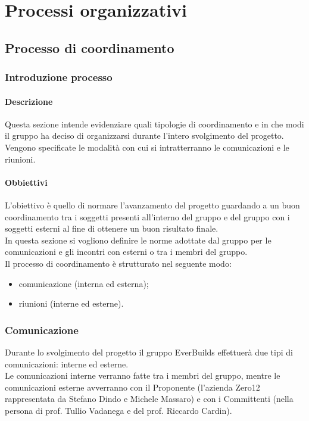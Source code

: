 \section{Processi organizzativi}
    \subsection{Processo di coordinamento}
        \subsubsection{Introduzione processo}
            \paragraph{Descrizione}
                Questa sezione intende evidenziare quali tipologie di coordinamento e in che modi il gruppo ha deciso di organizzarsi durante l’intero svolgimento del progetto.\\ 
                Vengono specificate le modalità con cui si intratterranno le comunicazioni e le riunioni.\\
            \paragraph{Obbiettivi}
                L’obiettivo è quello di normare l’avanzamento del progetto guardando a un buon coordinamento tra i soggetti presenti all’interno del gruppo e del gruppo con i soggetti esterni al fine di ottenere un buon risultato finale.\\ 
                In questa sezione si vogliono definire le norme adottate dal gruppo per le comunicazioni e gli incontri con esterni o tra i membri del gruppo.\\
                Il processo di coordinamento è strutturato nel seguente modo:\\
                \begin{itemize}
                    \item comunicazione (interna ed esterna);
                    \item riunioni (interne ed esterne).
                \end{itemize}
        \subsubsection{Comunicazione}
            Durante lo svolgimento del progetto il gruppo EverBuilds effettuerà due tipi di comunicazioni: interne ed esterne. \\
            Le comunicazioni interne verranno fatte tra i membri del gruppo, mentre le comunicazioni esterne avverranno con il Proponente (l’azienda Zero12 rappresentata da Stefano Dindo e Michele Massaro) e con i Committenti (nella persona di prof. Tullio Vadanega e del prof. Riccardo Cardin).\\
